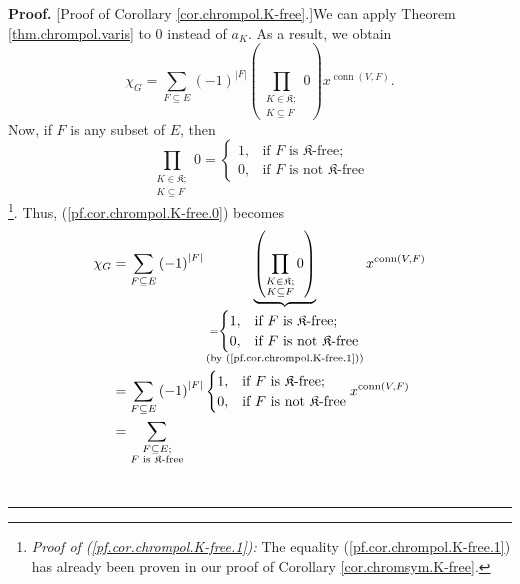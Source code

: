 \documentclass[numbers=enddot,12pt,final,onecolumn,notitlepage]{scrartcl}%
\theoremstyle{definition}
\newenvironment{proof}[1][Proof]{\noindent\textbf{#1.} }{\ \rule{0.5em}{0.5em}}
\newenvironment{verlong}{}{}
\let\sumnonlimits\sum
\let\prodnonlimits\prod
\renewcommand{\sum}{\sumnonlimits\limits}
\renewcommand{\prod}{\prodnonlimits\limits}
\begin{document}
\begin{verlong}
\begin{proof}
[Proof of Corollary \ref{cor.chrompol.K-free}.]We can apply Theorem
\ref{thm.chrompol.varis} to $0$ instead of $a_{K}$. As a result, we obtain%
\begin{equation}
\chi_{G}=\sum_{F\subseteq E}\left(  -1\right)  ^{\left\vert F\right\vert
}\left(  \prod_{\substack{K\in\mathfrak{K};\\K\subseteq F}}0\right)
x^{\operatorname*{conn}\left(  V,F\right)  }. \label{pf.cor.chrompol.K-free.0}%
\end{equation}
Now, if $F$ is any subset of $E$, then%
\begin{equation}
\prod_{\substack{K\in\mathfrak{K};\\K\subseteq F}}0=%
\begin{cases}
1, & \text{if }F\text{ is }\mathfrak{K}\text{-free;}\\
0, & \text{if }F\text{ is not }\mathfrak{K}\text{-free}%
\end{cases}
\label{pf.cor.chrompol.K-free.1}%
\end{equation}
\footnote{\textit{Proof of (\ref{pf.cor.chrompol.K-free.1}):} The equality
(\ref{pf.cor.chrompol.K-free.1}) has already been proven in our proof of
Corollary \ref{cor.chromsym.K-free}.}. Thus, (\ref{pf.cor.chrompol.K-free.0})
becomes%
\begin{align*}
\chi_{G}  &  =\sum_{F\subseteq E}\left(  -1\right)  ^{\left\vert F\right\vert
}\underbrace{\left(  \prod_{\substack{K\in\mathfrak{K};\\K\subseteq
F}}0\right)  }_{\substack{=%
\begin{cases}
1, & \text{if }F\text{ is }\mathfrak{K}\text{-free;}\\
0, & \text{if }F\text{ is not }\mathfrak{K}\text{-free}%
\end{cases}
\\\text{(by (\ref{pf.cor.chrompol.K-free.1}))}}}x^{\operatorname*{conn}\left(
V,F\right)  }\\
&  =\sum_{F\subseteq E}\left(  -1\right)  ^{\left\vert F\right\vert }%
\begin{cases}
1, & \text{if }F\text{ is }\mathfrak{K}\text{-free;}\\
0, & \text{if }F\text{ is not }\mathfrak{K}\text{-free}%
\end{cases}
x^{\operatorname*{conn}\left(  V,F\right)  }\\
&  =\sum_{\substack{F\subseteq E;\\F\text{ is }\mathfrak{K}\text{-free}%
}}
\end{align*}
\end{proof}
\end{verlong}
\end{document}
